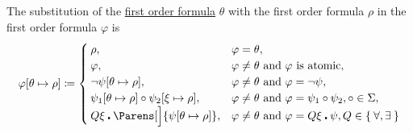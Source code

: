 \begin{definition}
\begin{DefEnum}
    The substitution of the \hyperref[def:first_order_language/formula]{first order formula} \( \theta \) with the first order formula \( \rho \) in the first order formula \( \varphi \) is
    \begin{equation}\label{eq:def:first_order_substitution/formula_in_formula}
      \varphi[\theta \mapsto \rho] \coloneqq \begin{cases}
        \rho,                                                       &\varphi = \theta, \\
        \varphi,                                                    &\varphi \neq \theta \T{and} \varphi \text{ is atomic}, \\
        \neg \psi[\theta \mapsto \rho],                             &\varphi \neq \theta \T{and} \varphi = \neg \psi, \\
        \psi_1[\theta \mapsto \rho] \circ \psi_2[\xi \mapsto \rho], &\varphi \neq \theta \T{and} \varphi = \psi_1 \circ \psi_2, \circ \in \Sigma, \\
        Q \xi \centerdot \Parens[\Big]{\psi[\theta \mapsto \rho]},  &\varphi \neq \theta \T{and} \varphi = Q \xi \centerdot \psi, Q \in \Set{ \forall, \exists }
      \end{cases}
    \end{equation}
  \end{DefEnum}
\end{definition}

